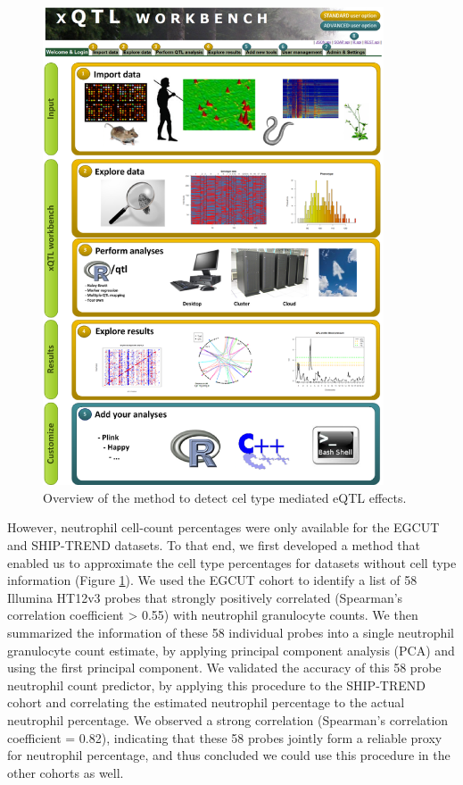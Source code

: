   \begin{figure}[h!]
  \centering
  \includegraphics[width=0.9\textwidth]{eps/image_4_4.eps}
  \caption[Methods overview]{Overview of the method to detect cel type mediated eQTL effects. }
          \label{fig:fig4_4}
  \end{figure}

  However, neutrophil cell-count percentages were only available for the EGCUT and SHIP-TREND datasets. 
  To that end, we first developed a method that enabled us to approximate the cell type percentages for 
  datasets without cell type information (Figure \ref{fig:fig4_4}). We used the EGCUT cohort to identify a list of 58 
  Illumina HT12v3 probes that strongly positively correlated (Spearman's correlation coefficient > 0.55) 
  with neutrophil granulocyte counts. We then summarized the information of these 58 individual probes 
  into a single neutrophil granulocyte count estimate, by applying principal component analysis (PCA) 
  and using the first principal component. We validated the accuracy of this 58 probe neutrophil count 
  predictor, by applying this procedure to the SHIP-TREND cohort and correlating the estimated neutrophil 
  percentage to the actual neutrophil percentage. We observed a strong correlation (Spearman's correlation 
  coefficient = 0.82), indicating that these 58 probes jointly form a reliable proxy for neutrophil 
  percentage, and thus concluded we could use this procedure in the other cohorts as well.

